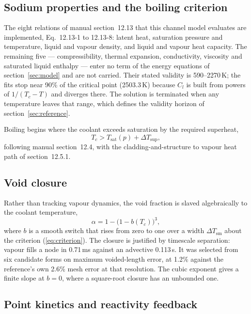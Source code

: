 \documentclass[11pt,a4paper]{article}
\begin{document}
\subsection{Sodium properties and the boiling criterion}

The eight relations of manual section~12.13 that this channel model evaluates are
implemented, Eq.~12.13-1 to 12.13-8: latent heat, saturation pressure and temperature,
liquid and vapour density, and liquid and vapour heat capacity. The remaining five ---
compressibility, thermal expansion, conductivity, viscosity and saturated liquid enthalpy
--- enter no term of the energy equations of section~\ref{sec:model} and are not carried.
Their stated validity is 590--2270\,K; the fits stop near 90\% of the critical point
(2503.3\,K) because $C_l$ is built from powers of $1/(T_c - T)$ and diverges there. The
solution is terminated when any temperature leaves that range, which defines the validity
horizon of section~\ref{sec:reference}.

Boiling begins where the coolant exceeds saturation by the required superheat,
\begin{equation}\label{eq:criterion}
T_c > T_{\mathrm{sat}}(p) + \Delta T_{\mathrm{sup}},
\end{equation}
following manual section~12.4, with the cladding-and-structure to vapour heat path of
section~12.5.1.

\subsection{Void closure}\label{sec:closure}

Rather than tracking vapour dynamics, the void fraction is slaved algebraically to the
coolant temperature,
\begin{equation}\label{eq:alpha}
\alpha = 1 - \bigl(1 - b(T_c)\bigr)^{3},
\end{equation}
where $b$ is a smooth switch that rises from zero to one over a width
$\Delta T_{\mathrm{sm}}$ about the criterion (\ref{eq:criterion}). The closure is justified
by timescale separation: vapour fills a node in 0.71\,ms against an advective 0.113\,s. It
was selected from six candidate forms on maximum voided-length error, at 1.2\% against the
reference's own 2.6\% mesh error at that resolution. The cubic exponent gives a finite
slope at $b = 0$, where a square-root closure has an unbounded one.

\subsection{Point kinetics and reactivity feedback}\label{sec:kinetics}
\end{document}
